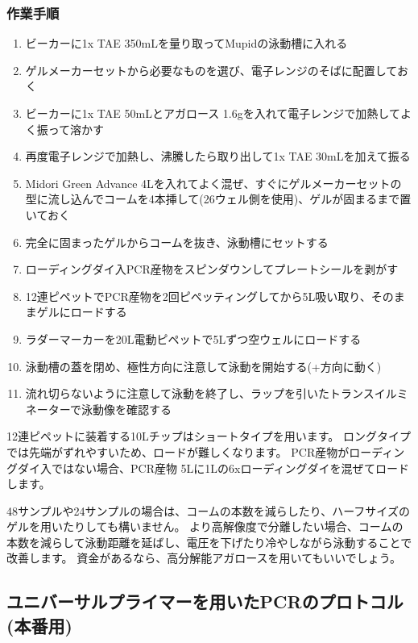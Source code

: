 \documentclass[titlepage,10pt,a4paper,uplatex]{jsbook}
\begin{document}
\subsubsection{作業手順}
\begin{enumerate}
\item ビーカーに1x TAE 350mLを量り取ってMupidの泳動槽に入れる
\item ゲルメーカーセットから必要なものを選び、電子レンジのそばに配置しておく
\item ビーカーに1x TAE 50mLとアガロース 1.6gを入れて電子レンジで加熱してよく振って溶かす
\item 再度電子レンジで加熱し、沸騰したら取り出して1x TAE 30mLを加えて振る
\item Midori Green Advance 4{\textmu}Lを入れてよく混ぜ、すぐにゲルメーカーセットの型に流し込んでコームを4本挿して(26ウェル側を使用)、ゲルが固まるまで置いておく
\item 完全に固まったゲルからコームを抜き、泳動槽にセットする
\item ローディングダイ入PCR産物をスピンダウンしてプレートシールを剥がす
\item 12連ピペットでPCR産物を2回ピペッティングしてから5{\textmu}L吸い取り、そのままゲルにロードする
\item ラダーマーカーを20{\textmu}L電動ピペットで5{\textmu}Lずつ空ウェルにロードする
\item 泳動槽の蓋を閉め、極性方向に注意して泳動を開始する(+方向に動く)
\item 流れ切らないように注意して泳動を終了し、ラップを引いたトランスイルミネーターで泳動像を確認する
\end{enumerate}

12連ピペットに装着する10{\textmu}Lチップはショートタイプを用います。
ロングタイプでは先端がずれやすいため、ロードが難しくなります。
PCR産物がローディングダイ入ではない場合、PCR産物 5{\textmu}Lに1{\textmu}Lの6xローディングダイを混ぜてロードします。

48サンプルや24サンプルの場合は、コームの本数を減らしたり、ハーフサイズのゲルを用いたりしても構いません。
より高解像度で分離したい場合、コームの本数を減らして泳動距離を延ばし、電圧を下げたり冷やしながら泳動することで改善します。
資金があるなら、高分解能アガロースを用いてもいいでしょう。

\subsection{ユニバーサルプライマーを用いたPCRのプロトコル (本番用)}
\end{document}

